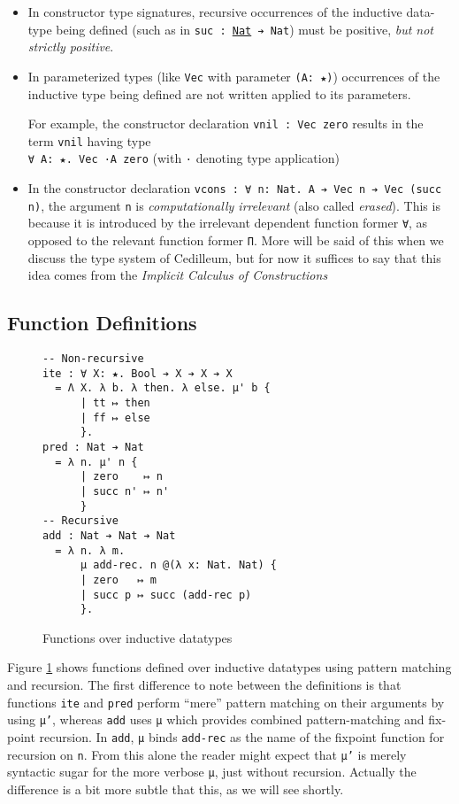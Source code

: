 \documentclass{article}
\begin{document}
\begin{itemize}
\item In constructor type signatures, recursive occurrences of the inductive
  data-type being defined (such as in \texttt{suc : \underline{Nat} ➔ Nat}) must
  be positive, \textit{but not strictly positive}.
\item In parameterized types (like \texttt{Vec} with parameter \texttt{(A: ★)})
  occurrences of the inductive type being defined are not written applied to
  its parameters.
  
  For example, the constructor declaration \texttt{vnil : Vec zero} results in
  the term \texttt{vnil} having type \\ \texttt{∀ A: ★. Vec ·A zero} (with \texttt{·}
  denoting type application)
\item In the constructor declaration \texttt{vcons : ∀ n: Nat. A ➔ Vec n ➔ Vec
    (succ n)}, the argument \texttt{n} is \textit{computationally irrelevant}
  (also called \textit{erased}). This is because it is introduced by the
  irrelevant dependent function former \texttt{∀}, as opposed to the relevant
  function former \texttt{Π}. More will be said of this when we discuss the type
  system of Cedilleum, but for now it suffices to say that this idea comes from
  the \textit{Implicit Calculus of Constructions}\cite{Mi01_ICC}
\end{itemize}

\subsection{Function Definitions}
\begin{figure}[h]
\begin{verbatim}
-- Non-recursive
ite : ∀ X: ★. Bool ➔ X ➔ X ➔ X
  = Λ X. λ b. λ then. λ else. μ' b {
      | tt ↦ then
      | ff ↦ else
      }.
pred : Nat ➔ Nat
  = λ n. μ' n {
      | zero    ↦ n
      | succ n' ↦ n'
      }
-- Recursive
add : Nat ➔ Nat ➔ Nat
  = λ n. λ m.
      μ add-rec. n @(λ x: Nat. Nat) {
      | zero   ↦ m
      | succ p ↦ succ (add-rec p)
      }.
\end{verbatim}
  \caption{Functions over inductive datatypes}
  \label{fig:ex-data-fun}
\end{figure}

Figure \ref{fig:ex-data-fun} shows functions defined over inductive datatypes
using pattern matching and recursion. The first difference to note between the
definitions is that functions \texttt{ite} and \texttt{pred} perform ``mere''
pattern matching on their arguments by using \texttt{μ'}, whereas \texttt{add}
uses \texttt{μ} which provides combined pattern-matching and fix-point
recursion. In \texttt{add}, \texttt{μ} binds \texttt{add-rec} as the name of the
fixpoint function for recursion on \texttt{n}. From this alone the reader might
expect that \texttt{μ'} is merely syntactic sugar for the more verbose
\texttt{μ}, just without recursion. Actually the difference is a bit more subtle
that this, as we will see shortly.
\end{document}
